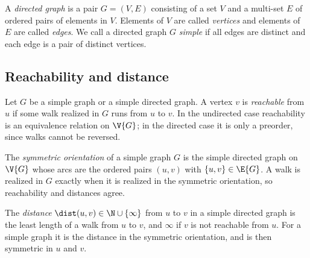 \begin{definition}
  A \textit{directed graph} is a pair $G = (V,E)$ consisting of a set $V$ 
  and a multi-set $E$ of ordered pairs of elements in $V$. 
  Elements of $V$ are called \textit{vertices} and elements of $E$ are called \textit{edges}.
  We call a directed graph $G$ \textit{simple} if all edges are distinct and
  each edge is a pair of distinct vertices.
\end{definition}


%


%
\subsection{Reachability and distance}

\begin{definition}[Reachability]
  \label{def:reachable-directed}
  \leanok
  Let $G$ be a simple graph or a simple directed graph. A vertex $v$ is \emph{reachable}
  from $u$ if some walk realized in $G$ runs from $u$ to $v$. In the undirected case
  reachability is an equivalence relation on $\V{G}$; in the directed case it is only a
  preorder, since walks cannot be reversed.
\end{definition}

\begin{definition}
  \label{def:symmetric-orientation}
  \leanok
  The \emph{symmetric orientation} of a simple graph $G$ is the simple directed graph on
  $\V{G}$ whose arcs are the ordered pairs $(u, v)$ with $\{u, v\} \in \E{G}$. A walk is
  realized in $G$ exactly when it is realized in the symmetric orientation, so
  reachability and distances agree.
\end{definition}

\begin{definition}[Distance]
  \label{def:dist}
  \leanok
  The \emph{distance} $\dist(u, v) \in \N \cup \{\infty\}$ from $u$ to $v$ in a simple
  directed graph is the least length of a walk from $u$ to $v$, and $\infty$ if $v$ is not
  reachable from $u$. For a simple graph it is the distance in the symmetric orientation,
  and is then symmetric in $u$ and $v$.
\end{definition}


